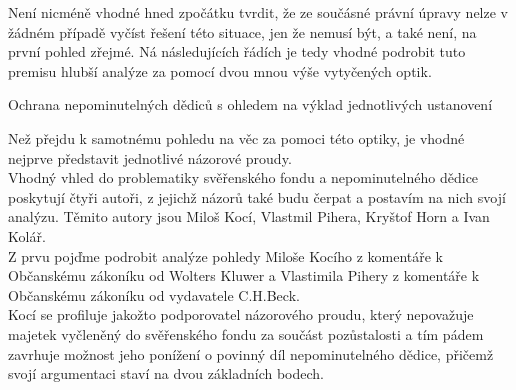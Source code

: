 \documentclass{article}
\begin{document}
Není nicméně vhodné hned zpočátku tvrdit, že ze součásné právní úpravy nelze v žádném případě vyčíst řešení této situace, jen že nemusí být, a také není, na první pohled zřejmé. Ná následujících řádích je tedy vhodné podrobit tuto premisu hlubší analýze za pomocí dvou mnou výše vytyčených optik.\\

   \begin{enumerate}
 {\Large\item[1.] Ochrana nepominutelných dědiců s ohledem na výklad jednotlivých ustanovení}
 \end{enumerate}
 
 Než přejdu k samotnému pohledu na věc za pomoci této optiky, je vhodné nejprve představit jednotlivé názorové proudy.\\
 
 Vhodný vhled do problematiky svěřenského fondu a nepominutelného dědice poskytují čtyři autoři, z jejichž názorů také budu čerpat a postavím na nich svojí analýzu. Těmito autory jsou Miloš Kocí, Vlastmil Pihera, Kryštof Horn a Ivan Kolář.\\
 
 Z prvu pojďme podrobit analýze pohledy Miloše Kocího z komentáře k Občanskému zákoníku od Wolters Kluwer a Vlastimila Pihery z komentáře k Občanskému zákoníku od vydavatele C.H.Beck.\\
 
 Kocí se profiluje jakožto podporovatel názorového proudu, který nepovažuje majetek vyčleněný do svěřenského fondu za součást pozůstalosti a tím pádem zavrhuje možnost jeho ponížení o povinný díl nepominutelného dědice, přičemž svojí argumentaci staví na dvou základních bodech.\\
 
\end{document}
